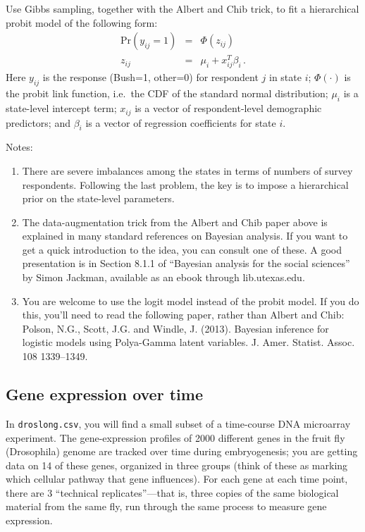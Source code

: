 \documentclass{article}
\begin{document}
Use Gibbs sampling, together with the Albert and Chib trick, to fit a hierarchical probit model of the following form:
\begin{eqnarray*}
\mbox{Pr}(y_{ij} = 1) &=& \Phi(z_{ij})  \\
z_{ij} &=& \mu_i + x_{ij}^T \beta_i \, .
\end{eqnarray*}
Here $y_{ij}$ is the response (Bush=1, other=0) for respondent $j$ in state $i$; $\Phi(\cdot)$ is the probit link function, i.e.~the CDF of the standard normal distribution; $\mu_i$ is a state-level intercept term; $x_{ij}$ is a vector of respondent-level demographic predictors; and $\beta_i$ is a vector of regression coefficients for state $i$.

Notes:
\begin{enumerate}
\item There are severe imbalances among the states in terms of numbers of survey respondents. Following the last problem, the key is to impose a hierarchical prior on the state-level parameters.
\item The data-augmentation trick from the Albert and Chib paper above is explained in many standard references on Bayesian analysis.  If you want to get a quick introduction to the idea, you can consult one of these.  A good presentation is in Section 8.1.1 of ``Bayesian analysis for the social sciences'' by Simon Jackman, available as an ebook through lib.utexas.edu.
\item You are welcome to use the logit model instead of the probit model.  If you do this, you'll need to read the following paper, rather than Albert and Chib: Polson, N.G., Scott, J.G. and Windle, J. (2013). Bayesian inference for logistic models using Polya-Gamma latent variables. J. Amer. Statist. Assoc. 108 1339--1349.  
\end{enumerate}


\subsection{Gene expression over time}

In \verb|droslong.csv|, you will find a small subset of a time-course DNA microarray experiment.  The gene-expression profiles of 2000 different genes in the fruit fly (Drosophila) genome are tracked over time during embryogenesis; you are getting data on 14 of these genes, organized in three groups (think of these as marking which cellular pathway that gene influences).  For each gene at each time point, there are 3 ``technical replicates''---that is, three copies of the same biological material from the same fly, run through the same process to measure gene expression.
\end{document}
